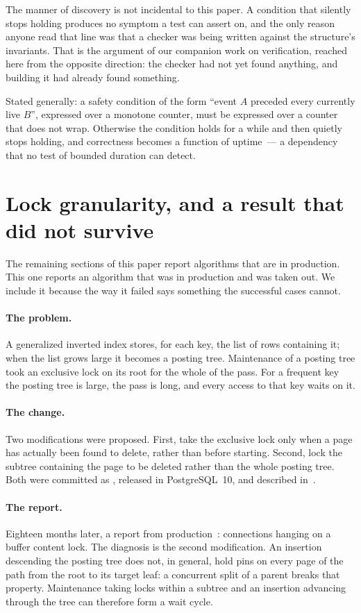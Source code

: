 The manner of discovery is not incidental to this paper. A condition that
silently stops holding produces no symptom a test can assert on, and the only
reason anyone read that line was that a checker was being written against the
structure's invariants. That is the argument of our companion work on
verification, reached here from the opposite direction: the checker had not yet
found anything, and building it had already found something.

Stated generally: a safety condition of the form ``event $A$ preceded every
currently live $B$'', expressed over a monotone counter, must be expressed over
a counter that does not wrap. Otherwise the condition holds for a while and then
quietly stops holding, and correctness becomes a function of uptime~--- a
dependency that no test of bounded duration can detect.

\section{Lock granularity, and a result that did not survive}
\label{sec:revert}

The remaining sections of this paper report algorithms that are in production.
This one reports an algorithm that was in production and was taken out. We
include it because the way it failed says something the successful cases cannot.

\paragraph{The problem.} A generalized inverted index stores, for each key, the
list of rows containing it; when the list grows large it becomes a posting tree.
Maintenance of a posting tree took an exclusive lock on its root for the whole
of the pass. For a frequent key the posting tree is large, the pass is long, and
every access to that key waits on it.

\paragraph{The change.} Two modifications were proposed. First, take the
exclusive lock only when a page has actually been found to delete, rather than
before starting. Second, lock the subtree containing the page to be deleted
rather than the whole posting tree. Both were committed as ,
released in PostgreSQL~10, and described in~\cite{borodin2018gin}.

\paragraph{The report.} Eighteen months later, a report from
production~\cite{bug-gin-lwlock-2018}: connections hanging on a buffer content
lock. The diagnosis is the second modification. An insertion descending the
posting tree does not, in general, hold pins on every page of the path from the
root to its target leaf: a concurrent split of a parent breaks that property.
Maintenance taking locks within a subtree and an insertion advancing through the
tree can therefore form a wait cycle.

